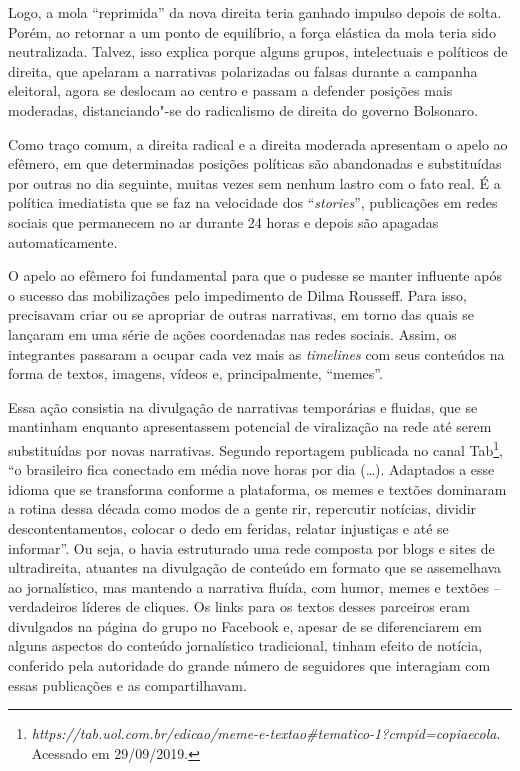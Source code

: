 Logo, a mola ``reprimida'' da nova direita teria ganhado impulso depois
de solta. Porém, ao retornar a um ponto de equilíbrio, a força elástica
da mola teria sido neutralizada. Talvez, isso explica porque alguns
grupos, intelectuais e políticos de direita, que apelaram a narrativas
polarizadas ou falsas durante a campanha eleitoral, agora se deslocam ao
centro e passam a defender posições mais moderadas, distanciando"-se do
radicalismo de direita do governo Bolsonaro.

Como traço comum, a direita radical e a direita moderada apresentam o
apelo ao efêmero, em que determinadas posições políticas são abandonadas
e substituídas por outras no dia seguinte, muitas vezes sem nenhum
lastro com o fato real. É a política imediatista que se faz na
velocidade dos ``\emph{stories}'', publicações em redes sociais que
permanecem no ar durante 24 horas e depois são apagadas automaticamente.

O apelo ao efêmero foi fundamental para que o  pudesse se manter
influente após o sucesso das mobilizações pelo impedimento de Dilma
Rousseff. Para isso, precisavam criar ou se apropriar de outras
narrativas, em torno das quais se lançaram em uma série de ações
coordenadas nas redes sociais. Assim, os integrantes passaram a ocupar
cada vez mais as \emph{timelines} com seus conteúdos na forma de textos,
imagens, vídeos e, principalmente, ``memes''.

Essa ação consistia na divulgação de narrativas temporárias e fluidas,
que se mantinham enquanto apresentassem potencial de viralização na rede
até serem substituídas por novas narrativas. Segundo reportagem
publicada no canal  Tab\footnote{\emph{https://tab.uol.com.br/edicao/meme-e-textao\#tematico-1?cmpid=copiaecola}.
  Acessado em 29/09/2019.}, ``o brasileiro fica conectado em média nove
horas por dia (\ldots{}). Adaptados a esse idioma que se transforma conforme
a plataforma, os memes e textões dominaram a rotina dessa década como
modos de a gente rir, repercutir notícias, dividir descontentamentos,
colocar o dedo em feridas, relatar injustiças e até se informar''. Ou
seja, o  havia estruturado uma rede composta por blogs e sites de
ultradireita, atuantes na divulgação de conteúdo em formato que se
assemelhava ao jornalístico, mas mantendo a narrativa fluída, com humor,
memes e textões -- verdadeiros líderes de cliques. Os links para os
textos desses parceiros eram divulgados na página do grupo no Facebook
e, apesar de se diferenciarem em alguns aspectos do conteúdo
jornalístico tradicional, tinham efeito de notícia, conferido pela
autoridade do grande número de seguidores que interagiam com essas
publicações e as compartilhavam.


